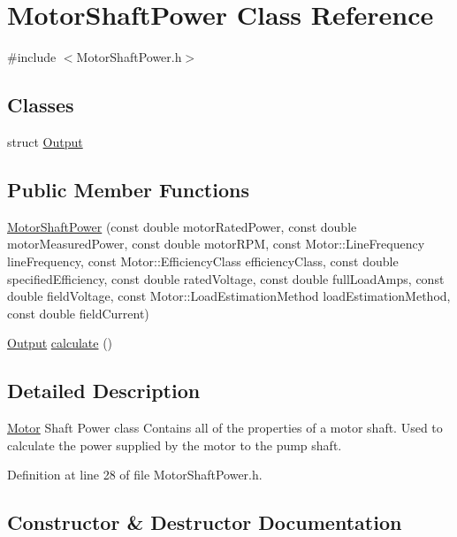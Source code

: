 \hypertarget{class_motor_shaft_power}{}\section{Motor\+Shaft\+Power Class Reference}
\label{class_motor_shaft_power}


{\ttfamily \#include $<$Motor\+Shaft\+Power.\+h$>$}

\subsection*{Classes}
\begin{DoxyCompactItemize}
\item 
struct \hyperlink{struct_motor_shaft_power_1_1_output}{Output}
\end{DoxyCompactItemize}
\subsection*{Public Member Functions}
\begin{DoxyCompactItemize}
\item 
\hyperlink{class_motor_shaft_power_acf65f63b1c78946df0987dd1a9a98c77}{Motor\+Shaft\+Power} (const double motor\+Rated\+Power, const double motor\+Measured\+Power, const double motor\+R\+PM, const Motor\+::\+Line\+Frequency line\+Frequency, const Motor\+::\+Efficiency\+Class efficiency\+Class, const double specified\+Efficiency, const double rated\+Voltage, const double full\+Load\+Amps, const double field\+Voltage, const Motor\+::\+Load\+Estimation\+Method load\+Estimation\+Method, const double field\+Current)
\item 
\hyperlink{struct_motor_shaft_power_1_1_output}{Output} \hyperlink{class_motor_shaft_power_a6823c05e9c0aaac25f3ef7b26ba613d2}{calculate} ()
\end{DoxyCompactItemize}


\subsection{Detailed Description}
\hyperlink{struct_motor}{Motor} Shaft Power class Contains all of the properties of a motor shaft. Used to calculate the power supplied by the motor to the pump shaft. 

Definition at line 28 of file Motor\+Shaft\+Power.\+h.



\subsection{Constructor \& Destructor Documentation}
\mbox{\label{class_motor_shaft_power_acf65f63b1c78946df0987dd1a9a98c77}} 
